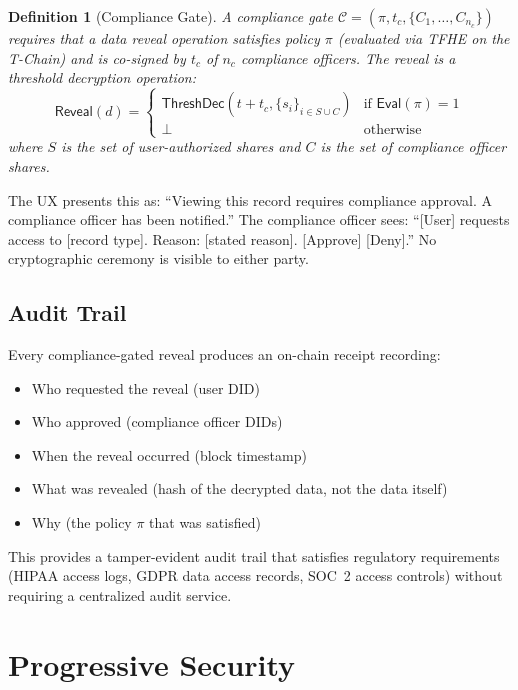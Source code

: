 \documentclass[11pt,a4paper]{article}
\newtheorem{definition}{Definition}
\begin{document}
\begin{definition}[Compliance Gate]
A compliance gate $\mathcal{C} = (\pi, t_c, \{C_1, \ldots, C_{n_c}\})$
requires that a data reveal operation satisfies policy $\pi$ (evaluated
via TFHE on the T-Chain) and is co-signed by $t_c$ of $n_c$ compliance
officers. The reveal is a threshold decryption operation:
\begin{equation}
    \mathsf{Reveal}(d) = \begin{cases}
    \mathsf{ThreshDec}(t + t_c, \{s_i\}_{i \in S \cup C}) & \text{if } \mathsf{Eval}(\pi) = 1 \\
    \perp & \text{otherwise}
    \end{cases}
\end{equation}
where $S$ is the set of user-authorized shares and $C$ is the set of
compliance officer shares.
\end{definition}

The UX presents this as: ``Viewing this record requires compliance
approval. A compliance officer has been notified.'' The compliance
officer sees: ``[User] requests access to [record type]. Reason:
[stated reason]. [Approve] [Deny].'' No cryptographic ceremony is
visible to either party.

\subsection{Audit Trail}

Every compliance-gated reveal produces an on-chain receipt recording:
\begin{itemize}
    \item Who requested the reveal (user DID)
    \item Who approved (compliance officer DIDs)
    \item When the reveal occurred (block timestamp)
    \item What was revealed (hash of the decrypted data, not the data itself)
    \item Why (the policy $\pi$ that was satisfied)
\end{itemize}

This provides a tamper-evident audit trail that satisfies regulatory
requirements (HIPAA access logs, GDPR data access records, SOC~2 access
controls) without requiring a centralized audit service.

\section{Progressive Security}\label{sec:progressive}
\end{document}
